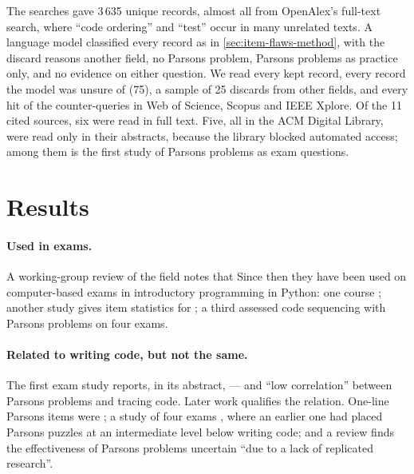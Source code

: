 The searches gave 3\,635 unique records, almost all from OpenAlex's
full-text search, where \enquote{code ordering} and \enquote{test} occur in
many unrelated texts.  A language model classified every record as in
\cref{sec:item-flaws-method}, with the discard reasons another field, no
Parsons problem, Parsons problems as practice only, and no evidence on
either question.  We read every kept record, every record the model was
unsure of (75), a sample of 25 discards from other fields, and every hit
of the counter-queries in Web of Science, Scopus and IEEE Xplore.  Of the
11 cited sources, six were read in full text.  Five, all in the ACM
Digital Library, were read only in their abstracts, because the library
blocked automated access; among them is the first study of Parsons
problems as exam questions.

\section{Results}
\label{sec:parsons-results}

\paragraph{Used in exams.}
A working-group review of the field notes that
  Since then they have been
used on computer-based exams in introductory programming in Python: one
course ; another study gives item statistics for
; a third assessed code sequencing with Parsons problems
on four exams\autocite[4]{newar2025}.

\paragraph{Related to writing code, but not the same.}
The first exam study reports, in its abstract,
 --- and \enquote{low correlation} between Parsons
problems and tracing code.  Later work qualifies the relation.  One-line
Parsons items were ;
a study of four exams , where an earlier one had placed Parsons puzzles at an
intermediate level below writing code\autocite{lopez2008}; and a review
finds the effectiveness of Parsons problems  uncertain
\enquote{due to a lack of replicated research}.

